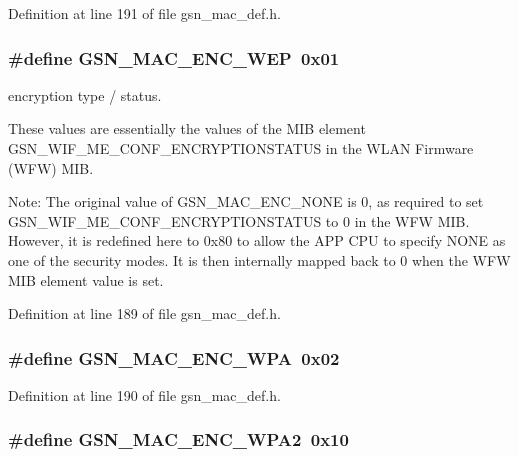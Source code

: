 Definition at line 191 of file gsn\_\-mac\_\-def.h.

\hypertarget{a00642_ga97e73490c2ebf96dc976cfa9819ca342}{
\subsubsection[{GSN\_\-MAC\_\-ENC\_\-WEP}]{\setlength{\rightskip}{0pt plus 5cm}\#define GSN\_\-MAC\_\-ENC\_\-WEP~0x01}}
\label{a00642_ga97e73490c2ebf96dc976cfa9819ca342}


encryption type / status. 

These values are essentially the values of the MIB element GSN\_\-WIF\_\-ME\_\-CONF\_\-ENCRYPTIONSTATUS in the WLAN Firmware (WFW) MIB.

Note: The original value of GSN\_\-MAC\_\-ENC\_\-NONE is 0, as required to set GSN\_\-WIF\_\-ME\_\-CONF\_\-ENCRYPTIONSTATUS to 0 in the WFW MIB. However, it is redefined here to 0x80 to allow the APP CPU to specify NONE as one of the security modes. It is then internally mapped back to 0 when the WFW MIB element value is set. 

Definition at line 189 of file gsn\_\-mac\_\-def.h.

\hypertarget{a00642_ga41cad5522df15c08084272449a15f488}{
\subsubsection[{GSN\_\-MAC\_\-ENC\_\-WPA}]{\setlength{\rightskip}{0pt plus 5cm}\#define GSN\_\-MAC\_\-ENC\_\-WPA~0x02}}
\label{a00642_ga41cad5522df15c08084272449a15f488}


Definition at line 190 of file gsn\_\-mac\_\-def.h.

\hypertarget{a00642_gad400c18aedc0468b5338a51ddfd65803}{
\subsubsection[{GSN\_\-MAC\_\-ENC\_\-WPA2}]{\setlength{\rightskip}{0pt plus 5cm}\#define GSN\_\-MAC\_\-ENC\_\-WPA2~0x10}}
\label{a00642_gad400c18aedc0468b5338a51ddfd65803}


